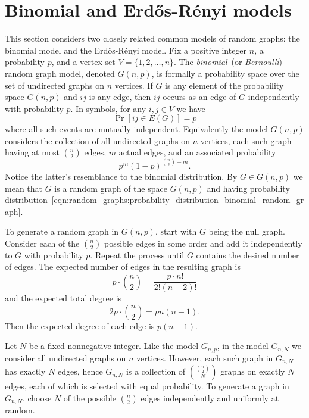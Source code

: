 
\section{Binomial and Erd\H{o}s-R{\'e}nyi models}

This section considers two closely related common models of random
graphs: the binomial model and the Erd\H{o}s-R\'enyi model. Fix a
positive integer $n$, a probability $p$, and a vertex set
$V = \{1, 2, \dots, n\}$. The
\emph{binomial}~(or
\emph{Bernoulli}) random graph model,
denoted $G(n,p)$, is formally a probability
space over the set of undirected graphs on $n$ vertices. If $G$ is any
element of the probability space $G(n,p)$ and $ij$ is any edge, then
$ij$ occurs as an edge of $G$ independently with probability $p$. In
symbols, for any $i,j \in V$ we have
\[
\Pr[ij \in E(G)]
=
p
\]
where all such events are mutually independent. Equivalently the model
$G(n,p)$ considers the collection of all undirected graphs on $n$
vertices, each such graph having at most $\binom{n}{2}$ edges, $m$
actual edges, and an associated probability
\begin{equation}
\label{eqn:random_graphs:probability_distribution_binomial_random_graph}
p^m (1 - p)^{\binom{n}{2} - m}.
\end{equation}
Notice the latter's resemblance to the
binomial distribution. By
$G \in G(n,p)$ we mean that $G$ is a random graph of the space
$G(n,p)$ and having probability
distribution~\eqref{eqn:random_graphs:probability_distribution_binomial_random_graph}.

To generate a random graph in $G(n,p)$, start with $G$ being the
null graph. Consider each of the $\binom{n}{2}$
possible edges in some order and add it independently to $G$ with
probability $p$. Repeat the process until $G$ contains the desired
number of edges. The expected number of edges in the resulting graph
is
\[
p \cdot \binom{n}{2}
=
\frac{p \cdot n!} {2! (n - 2)!}
\]
and the expected total degree is
\[
2p \cdot \binom{n}{2}
=
pn(n - 1).
\]
Then the expected degree of each edge is $p(n - 1)$.

Let $N$ be a fixed nonnegative integer. Like the model $G_{n,p}$, in
the model $G_{n,N}$ we consider all undirected graphs on $n$
vertices. However, each such graph in $G_{n,N}$ has exactly $N$ edges,
hence $G_{n,N}$ is a collection of $\binom{\binom{n}{2}} {N}$ graphs
on exactly $N$ edges, each of which is selected with equal
probability. To generate a graph in $G_{n,N}$, choose $N$ of the
possible $\binom{n}{2}$ edges independently and uniformly at random.

